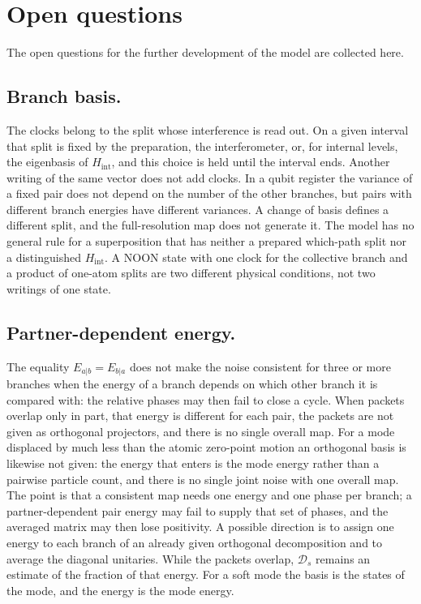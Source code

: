 \documentclass[11pt,a4paper]{article}
\begin{document}
\section{Open questions}\label{sec:open}

The open questions for the further development of the model are collected here.

\subsection{Branch basis.}
\label{sec:open_basis}
The clocks belong to the split whose interference is read out. On a given interval that split is fixed by the preparation, the interferometer, or, for internal levels, the eigenbasis of $H_{\mathrm{int}}$, and this choice is held until the interval ends. Another writing of the same vector does not add clocks. In a qubit register the variance of a fixed pair does not depend on the number of the other branches, but pairs with different branch energies have different variances. A change of basis defines a different split, and the full-resolution map does not generate it. The model has no general rule for a superposition that has neither a prepared which-path split nor a distinguished $H_{\mathrm{int}}$. A NOON state with one clock for the collective branch and a product of one-atom splits are two different physical conditions, not two writings of one state.

\subsection{Partner-dependent energy.}
\label{sec:open_pair}
The equality $E_{a|b}=E_{b|a}$ does not make the noise consistent for three or more branches when the energy of a branch depends on which other branch it is compared with: the relative phases may then fail to close a cycle. When packets overlap only in part, that energy is different for each pair, the packets are not given as orthogonal projectors, and there is no single overall map. For a mode displaced by much less than the atomic zero-point motion an orthogonal basis is likewise not given: the energy that enters is the mode energy rather than a pairwise particle count, and there is no single joint noise with one overall map. The point is that a consistent map needs one energy and one phase per branch; a partner-dependent pair energy may fail to supply that set of phases, and the averaged matrix may then lose positivity. A possible direction is to assign one energy to each branch of an already given orthogonal decomposition and to average the diagonal unitaries. While the packets overlap, $\mathcal D_s$ remains an estimate of the fraction of that energy. For a soft mode the basis is the states of the mode, and the energy is the mode energy.
\end{document}
